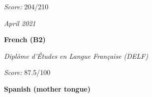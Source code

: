\documentclass[10pt, letterpaper]{article}
\begin{document}
        \vspace{0.10 cm}
        \begin{onecolentry}
            \begin{highlights}
                \item \emph{Score:} 204/210 %
            \end{highlights}
        \end{onecolentry}

        \vspace{0.2 cm}
    
        \begin{twocolentry}{
            
        \textit{April 2021}}
            \textbf{French (B2)}

            \textit{Diplôme d'Études en Langue Française (DELF)}
        \end{twocolentry}

        \vspace{0.10 cm}
        \begin{onecolentry}
            \begin{highlights}
                \item \emph{Score:} 87.5/100 %
            \end{highlights}
        \end{onecolentry}

        \vspace{0.2 cm}

        \begin{onecolentry}
            \textbf{Spanish (mother tongue)}
        \end{onecolentry}
\end{document}
